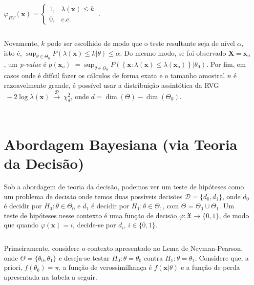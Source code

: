 \documentclass[
]{book}
\begin{document}
\({\varphi}_{RV}(\boldsymbol x)=\left\{\begin{array}{rl} 1,& \lambda(\boldsymbol x) \leq k\\ 0,& c.c.\end{array}\right.~.\)

\(~\)

Novamente, \(k\) pode ser escolhido de modo que o teste resultante seja de nível \(\alpha\), isto é, \(\displaystyle \sup_{\theta \in \Theta_0} P\left(\lambda(\boldsymbol x) \leq k \Big | \theta\right) \leq \alpha\). Do mesmo modo, se foi observado \(\boldsymbol X=\boldsymbol x_o\), um \emph{p-value} é \(p(\boldsymbol x_o)\) \(=\displaystyle \sup_{\theta \in \Theta_0}P\left(\left\{\boldsymbol x: \lambda(\boldsymbol x) \leq \lambda(\boldsymbol x_o)\right\}\big|\theta_0\right)\). Por fim, em casos onde é difícil fazer os cálculos de forma exata e o tamanho amostral \(n\) é razoavelmente grande, é possível usar a distribuição assintótica da RVG \(~-2\log \lambda(\boldsymbol x)\overset{\mathcal{D}}{~\longrightarrow~}\chi_d^2\), onde \(d=\dim(\Theta)-\dim(\Theta_0)\).

\(~\)

\(~\)

\hypertarget{abordagem-bayesiana-via-teoria-da-decisuxe3o}{%
\section{Abordagem Bayesiana (via Teoria da Decisão)}\label{abordagem-bayesiana-via-teoria-da-decisuxe3o}}

Sob a abordagem de teoria da decisão, podemos ver um teste de hipóteses como um problema de decisão onde temos duas possíveis decisões \(\mathcal{D}=\{d_0,d_1\}\), onde \(d_0\) é decidir por \(H_0:\theta \in \Theta_0\) e \(d_1\) é decidir por \(H_1:\theta \in \Theta_1\), com \(\Theta=\Theta_0\cup\Theta_1\). Um teste de hipóteses nesse contexto é uma função de decisão \(\varphi: \mathfrak{X} \longrightarrow \{0,1\}\), de modo que quando \(\varphi(\boldsymbol x)=i\), decide-se por \(d_i\), \(i\in \{0,1\}\).

\(~\)

Primeiramente, considere o contexto apresentado no Lema de Neyman-Pearson, onde \(\Theta=\{\theta_0,\theta_1\}\) e deseja-se testar \(H_0: \theta=\theta_0\) contra \(H_1: \theta = \theta_1\). Considere que, a priori, \(f(\theta_0) = \pi\), a função de verossimilhança é \(f(\boldsymbol x |\theta)\) e a função de perda apresentada na tabela a seguir.
\end{document}
